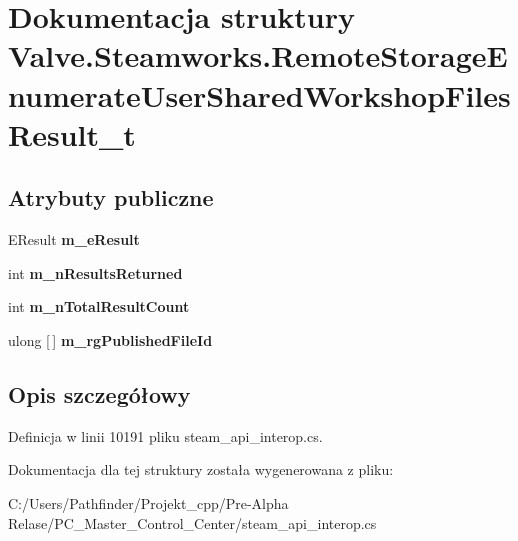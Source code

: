 \hypertarget{struct_valve_1_1_steamworks_1_1_remote_storage_enumerate_user_shared_workshop_files_result__t}{}\section{Dokumentacja struktury Valve.\+Steamworks.\+Remote\+Storage\+Enumerate\+User\+Shared\+Workshop\+Files\+Result\+\_\+t}
\label{struct_valve_1_1_steamworks_1_1_remote_storage_enumerate_user_shared_workshop_files_result__t}
\subsection*{Atrybuty publiczne}
\begin{DoxyCompactItemize}
\item 
\mbox{\label{struct_valve_1_1_steamworks_1_1_remote_storage_enumerate_user_shared_workshop_files_result__t_a04d2c2d909b6725e450260232f6789af}} 
E\+Result {\bfseries m\+\_\+e\+Result}
\item 
\mbox{\label{struct_valve_1_1_steamworks_1_1_remote_storage_enumerate_user_shared_workshop_files_result__t_a4134156b6bd84b2f69c94328160af32e}} 
int {\bfseries m\+\_\+n\+Results\+Returned}
\item 
\mbox{\label{struct_valve_1_1_steamworks_1_1_remote_storage_enumerate_user_shared_workshop_files_result__t_ae63a7f4dbf75fde3d9a82003c2cbaf67}} 
int {\bfseries m\+\_\+n\+Total\+Result\+Count}
\item 
\mbox{\label{struct_valve_1_1_steamworks_1_1_remote_storage_enumerate_user_shared_workshop_files_result__t_a604e5b4eb0973fa598f5d80b4a03864a}} 
ulong \mbox{[}$\,$\mbox{]} {\bfseries m\+\_\+rg\+Published\+File\+Id}
\end{DoxyCompactItemize}


\subsection{Opis szczegółowy}


Definicja w linii 10191 pliku steam\+\_\+api\+\_\+interop.\+cs.



Dokumentacja dla tej struktury została wygenerowana z pliku\+:\begin{DoxyCompactItemize}
\item 
C\+:/\+Users/\+Pathfinder/\+Projekt\+\_\+cpp/\+Pre-\/\+Alpha Relase/\+P\+C\+\_\+\+Master\+\_\+\+Control\+\_\+\+Center/steam\+\_\+api\+\_\+interop.\+cs\end{DoxyCompactItemize}

